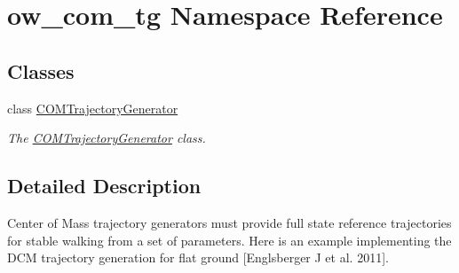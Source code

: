 \hypertarget{namespaceow__com__tg}{}\section{ow\+\_\+com\+\_\+tg Namespace Reference}
\label{namespaceow__com__tg}
\subsection*{Classes}
\begin{DoxyCompactItemize}
\item 
class \hyperlink{classow__com__tg_1_1COMTrajectoryGenerator}{C\+O\+M\+Trajectory\+Generator}
\begin{DoxyCompactList}\small\item\em The \hyperlink{classow__com__tg_1_1COMTrajectoryGenerator}{C\+O\+M\+Trajectory\+Generator} class. \end{DoxyCompactList}\end{DoxyCompactItemize}


\subsection{Detailed Description}
Center of Mass trajectory generators must provide full state reference trajectories for stable walking from a set of parameters. Here is an example implementing the D\+CM trajectory generation for flat ground \mbox{[}Englsberger J et al. 2011\mbox{]}. 